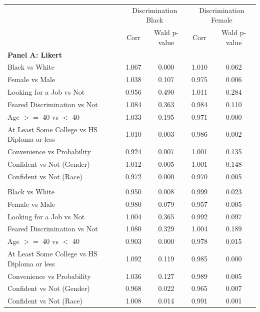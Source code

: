   \centering
  \begin{tabular}{lcccc}
    \toprule
    & \multicolumn{2}{c}{Discrimination Black} & \multicolumn{2}{c}{Discrimination Female} \\
    & Corr & Wald p-value & Corr & Wald p-value \\
    \midrule
    \multicolumn{5}{l}{\textbf{Panel A: Likert}}\\
    Black vs White & 1.067 & 0.000 & 1.010 & 0.062 \\
    Female vs Male & 1.038 & 0.107 & 0.975 & 0.006 \\
    Looking for a Job vs Not & 0.956 & 0.490 & 1.011 & 0.284 \\
    Feared Discrimination vs Not & 1.084 & 0.363 & 0.984 & 0.110 \\
    Age $>=$ 40 vs $<$ 40 & 1.033 & 0.195 & 0.971 & 0.000 \\
    At Least Some College vs HS Diploma or less & 1.010 & 0.003 & 0.986 & 0.002 \\
    Convenience vs Probability & 0.924 & 0.007 & 1.001 & 0.135 \\
    Confident vs Not (Gender) & 1.012 & 0.005 & 1.001 & 0.148 \\
    Confident vs Not (Race) & 0.972 & 0.000 & 0.970 & 0.005 \\
    \addlinespace
    \multicolumn{5}{l}{\textbf{Panel B: Borda}}\\
    Black vs White & 0.950 & 0.008 & 0.999 & 0.023 \\
    Female vs Male & 0.980 & 0.079 & 0.957 & 0.005 \\
    Looking for a Job vs Not & 1.004 & 0.365 & 0.992 & 0.097 \\
    Feared Discrimination vs Not & 1.080 & 0.329 & 1.004 & 0.189 \\
    Age $>=$ 40 vs $<$ 40 & 0.903 & 0.000 & 0.978 & 0.015 \\
    At Least Some College vs HS Diploma or less & 1.092 & 0.119 & 0.985 & 0.000 \\
    Convenience vs Probability & 1.036 & 0.127 & 0.989 & 0.005 \\
    Confident vs Not (Gender) & 0.968 & 0.022 & 0.965 & 0.007 \\
    Confident vs Not (Race) & 1.008 & 0.014 & 0.991 & 0.001 \\
    \bottomrule
  \end{tabular}
